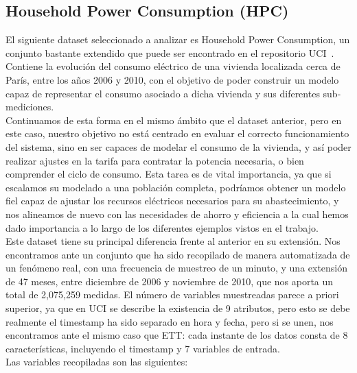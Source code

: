 \subsection{Household Power Consumption (HPC)}

El siguiente dataset seleccionado a analizar es Household Power Consumption, un conjunto bastante extendido que puede ser encontrado en el repositorio UCI~\cite{hebrail2006individual}. Contiene la evolución del consumo eléctrico de una vivienda localizada cerca de París, entre los años 2006 y 2010, con el objetivo de poder construir un modelo capaz de representar el consumo asociado a dicha vivienda y sus diferentes sub-mediciones.\\

Continuamos de esta forma en el mismo ámbito que el dataset anterior, pero en este caso, nuestro objetivo no está centrado en evaluar el correcto funcionamiento del sistema, sino en ser capaces de modelar el consumo de la vivienda, y así poder realizar ajustes en la tarifa para contratar la potencia necesaria, o bien comprender el ciclo de consumo. Esta tarea es de vital importancia, ya que si escalamos su modelado a una población completa, podríamos obtener un modelo fiel capaz de ajustar los recursos eléctricos necesarios para su abastecimiento, y nos alineamos de nuevo con las necesidades de ahorro y eficiencia a la cual hemos dado importancia a lo largo de los diferentes ejemplos vistos en el trabajo.\\

Este dataset tiene su principal diferencia frente al anterior en su extensión. Nos encontramos ante un conjunto que ha sido recopilado de manera automatizada de un fenómeno real, con una frecuencia de muestreo de un minuto, y una extensión de 47 meses, entre diciembre de 2006 y noviembre de 2010, que nos aporta un total de 2,075,259 medidas. El número de variables muestreadas parece a priori superior, ya que en UCI se describe la existencia de 9 atributos, pero esto se debe realmente el timestamp ha sido separado en hora y fecha, pero si se unen, nos encontramos ante el mismo caso que ETT: cada instante de los datos consta de 8 características, incluyendo el timestamp y 7 variables de entrada.\\

Las variables recopiladas son las siguientes:

